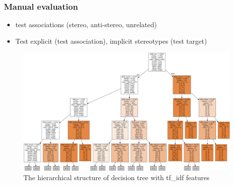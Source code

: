 \subsubsection{Manual evaluation}
\begin{itemize}
    \item test associations (stereo, anti-stereo, unrelated)
    \item Test explicit (test association), implicit stereotypes (test target)
\end{itemize}

\begin{landscape}
\begin{figure}[h!]
    \centering
    \includegraphics[width=1\textwidth]{thesis/figures/decision_tree_graphivz.png}
    \caption{The hierarchical structure of decision tree with tf\_idf features}
    \label{fig:decision_tree_baseline}
\end{figure}
\end{landscape}